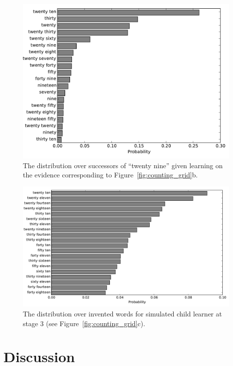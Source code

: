 \documentclass[10pt,letterpaper]{article}
\begin{document}
\begin{figure}[t]
\includegraphics[width=0.9\linewidth]{figures/after29}
\caption{The distribution over successors of ``twenty nine'' given learning on the evidence corresponding to Figure~\ref{fig:counting_grid}b. \label{fig:after29}}
\end{figure}


\begin{figure}[t]
\includegraphics[width=0.9\linewidth]{figures/inventedWords}
\caption{The distribution over invented words for simulated child
  learner at stage
  3 (see Figure~\ref{fig:counting_grid}c). \label{fig:inventedWords}}
\end{figure}


\section{Discussion}


\end{document}
